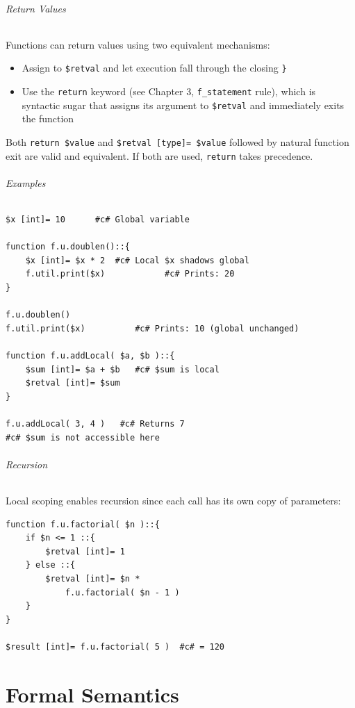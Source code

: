 \paragraph{Return Values}
Functions can return values using two equivalent mechanisms:
\begin{itemize}
\item Assign to \texttt{\$retval} and let execution fall through the closing \texttt{\}}
\item Use the \texttt{return} keyword (see Chapter 3, \texttt{f\_statement} rule), which is syntactic sugar that assigns its argument to \texttt{\$retval} and immediately exits the function
\end{itemize}
Both \texttt{return \$value} and \texttt{\$retval [type]= \$value} followed by natural function exit are valid and equivalent. If both are used, \texttt{return} takes precedence.

\paragraph{Examples}
\begin{verbatim}
$x [int]= 10      #c# Global variable

function f.u.doublen()::{
    $x [int]= $x * 2  #c# Local $x shadows global
    f.util.print($x)            #c# Prints: 20
}

f.u.doublen()
f.util.print($x)          #c# Prints: 10 (global unchanged)

function f.u.addLocal( $a, $b )::{
    $sum [int]= $a + $b   #c# $sum is local
    $retval [int]= $sum
}

f.u.addLocal( 3, 4 )   #c# Returns 7
#c# $sum is not accessible here
\end{verbatim}

\paragraph{Recursion}
Local scoping enables recursion since each call has its own copy of parameters:
\begin{verbatim}
function f.u.factorial( $n )::{
    if $n <= 1 ::{
        $retval [int]= 1
    } else ::{
        $retval [int]= $n * 
            f.u.factorial( $n - 1 )
    }
}

$result [int]= f.u.factorial( 5 )  #c# = 120
\end{verbatim}




\part{Formal Semantics}
